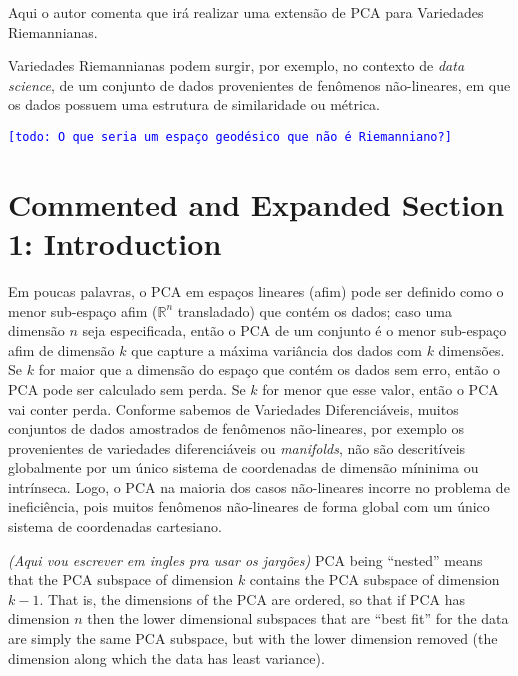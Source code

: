 \documentclass[a4paper,titlepage]{article}
\newcommand{\indraftnote}[1]{\textcolor{blue}{\texttt{\footnotesize [#1]}}}
\newcommand{\todo}[1]{\indraftnote{todo: #1}} %
\begin{document}
Aqui o autor comenta que irá realizar uma extensão de PCA para Variedades
Riemannianas.

Variedades Riemannianas podem surgir, por exemplo, no contexto de \emph{data science}, de um conjunto de dados
provenientes de fenômenos não-lineares, em que os dados possuem uma estrutura de
similaridade ou métrica.

\todo{O que seria um espaço geodésico que não é Riemanniano?}

{
\vspace{1em}
\vspace{1em}
}

\section{Commented and Expanded Section 1: Introduction}

{
\vspace{1em}
\vspace{1em}
}

Em poucas palavras, o PCA em espaços lineares (afim) pode ser definido
como o menor sub-espaço afim ($\mathbb R^n$ transladado) que contém os dados;
caso uma dimensão $n$ seja especificada, então o PCA de um conjunto é 
o menor sub-espaço afim de dimensão $k$ que capture a máxima variância dos dados
com $k$ dimensões. Se $k$ for maior que a dimensão do espaço que contém os dados
sem erro, então o PCA pode ser calculado sem perda. Se $k$ for menor que esse
valor, então o PCA vai conter perda. Conforme sabemos de Variedades
Diferenciáveis, muitos conjuntos de dados amostrados de fenômenos não-lineares,
por exemplo os provenientes de variedades diferenciáveis ou \emph{manifolds},
não são descritíveis globalmente por um único sistema de coordenadas de dimensão
míninima ou intrínseca. Logo, o PCA na maioria dos casos não-lineares incorre no
problema de ineficiência, pois muitos fenômenos não-lineares de forma global
com um único sistema de coordenadas cartesiano.

\emph{(Aqui vou escrever em ingles pra usar os jargões)}
PCA being ``nested'' means that the PCA subspace of dimension $k$ contains the
PCA subspace of dimension $k-1$. That is, the dimensions of the PCA are ordered,
so that if PCA has dimension $n$ then the lower dimensional subspaces that are
``best fit'' for the data are simply the same PCA subspace, but with the lower
dimension removed (the dimension along which the data has least variance). 
 
\end{document}

